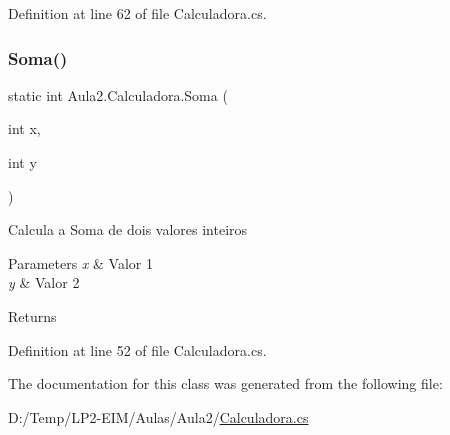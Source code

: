 Definition at line 62 of file Calculadora.\+cs.

\mbox{\label{class_aula2_1_1_calculadora_ad9b0bc0e9294baabad8b90476df16216}} 
\subsubsection{\texorpdfstring{Soma()}{Soma()}}
{\footnotesize\ttfamily static int Aula2.\+Calculadora.\+Soma (\begin{DoxyParamCaption}\item[{int}]{x,  }\item[{int}]{y }\end{DoxyParamCaption})\hspace{0.3cm}{\ttfamily [static]}}



Calcula a Soma de dois valores inteiros 


\begin{DoxyParams}{Parameters}
{\em x} & Valor 1\\
\hline
{\em y} & Valor 2\\
\hline
\end{DoxyParams}
\begin{DoxyReturn}{Returns}

\end{DoxyReturn}


Definition at line 52 of file Calculadora.\+cs.



The documentation for this class was generated from the following file\+:\begin{DoxyCompactItemize}
\item 
D\+:/\+Temp/\+L\+P2-\/\+E\+I\+M/\+Aulas/\+Aula2/\mbox{\hyperlink{_calculadora_8cs}{Calculadora.\+cs}}\end{DoxyCompactItemize}
